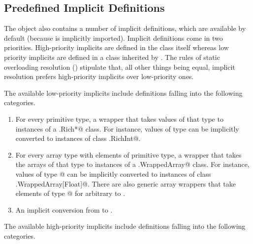 \subsection{Predefined Implicit Definitions}

The \lstinline@Predef@ object also contains a number of implicit definitions, which are available by default (because \lstinline@Predef@ is implicitly imported).
Implicit definitions come in two priorities. High-priority implicits are defined in the \lstinline@Predef@ class itself whereas low priority implicits are defined in a class inherited by \lstinline@Predef@. The rules of 
static overloading resolution ()
stipulate that, all other things being equal, implicit resolution 
prefers high-priority implicits over low-priority ones.

The available low-priority implicits include definitions falling into the following categories.

\begin{enumerate}
\item
For every primitive type, a wrapper that takes values of that type
to instances of a \lstinline@runtime.Rich*@ class. For instance, values of type \lstinline@Int@
can be implicitly converted to instances of class \lstinline@runtime.RichInt@.
\item
For every array type with elements of primitive type, a wrapper that
takes the arrays of that type to instances of a \lstinline@runtime.WrappedArray@ class. For instance, values of type \lstinline@Array[Float]@ can be implicitly converted to instances of class \lstinline@runtime.WrappedArray[Float]@.
There are also generic array wrappers that take elements
of type \lstinline@Array[T]@ for arbitrary \lstinline@T@ to \lstinline@WrappedArray@s.
\item
An implicit conversion from \lstinline@String@ to \lstinline@WrappedString@.
\end{enumerate}

The available high-priority implicits include definitions falling into the following categories.

